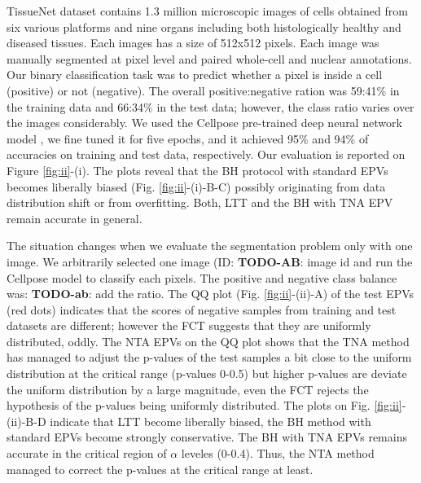 \documentclass{article}
\newcommand{\todo}[2]{{\color{red} {\bf TODO-#1}: #2}}
\begin{document}
TissueNet dataset contains 1.3 million microscopic images of cells obtained from six various platforms and nine organs including both histologically healthy and diseased tissues. Each images has a size of 512x512 pixels. Each image was manually segmented at pixel level and paired whole-cell and nuclear annotations. Our binary classification task was to predict whether a pixel is inside a cell (positive) or not (negative). The overall positive:negative ration was 59:41\% in the training data and 66:34\% in the test data; however, the class ratio varies over the images considerably. We used the Cellpose pre-trained deep neural network model \cite{cellpose}, we fine tuned it for five epochs, and it achieved 95\% and 94\% of accuracies  on training and test data, respectively. Our evaluation is reported on Figure \ref{fig:ii}-(i). The plots reveal that the BH protocol with standard EPVs becomes liberally biased (Fig. \ref{fig:ii}-(i)-B-C) possibly originating from data distribution shift or from overfitting. Both, LTT and the BH with TNA EPV remain accurate in general. 

The situation changes when we evaluate the segmentation problem only with one image. We arbitrarily selected one image (ID: \todo{AB}{image id} and run the Cellpose model to classify each pixels. The positive and negative class balance was: \todo{ab}{add the ratio}. The QQ plot (Fig. \ref{fig:ii}-(ii)-A) of the test EPVs (red dots) indicates that the scores of negative samples from training and test datasets are different; however the FCT suggests that they are uniformly distributed, oddly. The NTA EPVs on the QQ plot shows that the TNA method has managed to adjust the p-values of the test samples a bit close to the uniform distribution at the critical range (p-values 0-0.5) but higher p-values are deviate the uniform distribution by a large magnitude, even the FCT rejects the hypothesis of the p-values being uniformly distributed.  The plots on Fig. \ref{fig:ii}-(ii)-B-D indicate that LTT become liberally biased, the BH method with standard EPVs become strongly conservative. The BH with TNA EPVs remains accurate in the critical region of $\alpha$ leveles (0-0.4). Thus, the NTA method managed to correct the p-values at the critical range at least. 
\end{document}
